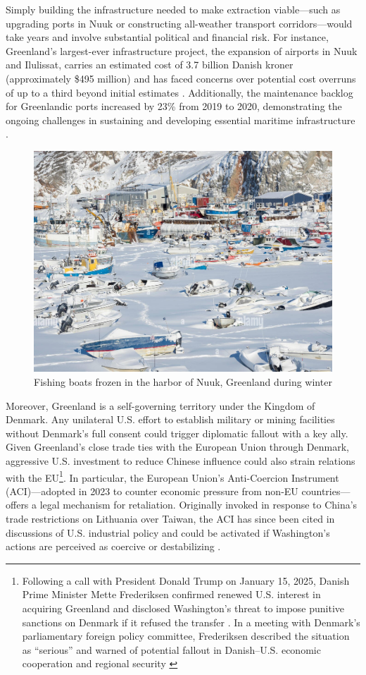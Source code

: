 \documentclass{adonis}
\begin{document}
    Simply building the infrastructure needed to make extraction viable—such as upgrading ports in Nuuk or constructing all-weather transport corridors—would take years and involve substantial political and financial risk. For instance, Greenland’s largest-ever infrastructure project, the expansion of airports in Nuuk and Ilulissat, carries an estimated cost of 3.7 billion Danish kroner (approximately \$495 million) and has faced concerns over potential cost overruns of up to a third beyond initial estimates \citep{asce2022airports, arctictoday2022overruns}. Additionally, the maintenance backlog for Greenlandic ports increased by 23\% from 2019 to 2020, demonstrating the ongoing challenges in sustaining and developing essential maritime infrastructure \citep{highnorth2021ports}.

     \begin{figure}[H]
        \centering
        \includegraphics[width=0.58\linewidth]{images/frozen-harbor-with-fishing-boats-greenland-WAK1F6.jpg}
        \caption{Fishing boats frozen in the harbor of Nuuk, Greenland during winter \citep{alamy_wak1f6}}
        \label{fig:enter-label}
    \end{figure}

    Moreover, Greenland is a self-governing territory under the Kingdom of Denmark. Any unilateral U.S. effort to establish military or mining facilities without Denmark’s full consent could trigger diplomatic fallout with a key ally. Given Greenland’s close trade ties with the European Union through Denmark, aggressive U.S. investment to reduce Chinese influence could also strain relations with the EU\footnote{Following a call with President Donald Trump on January 15, 2025, Danish Prime Minister Mette Frederiksen confirmed renewed U.S. interest in acquiring Greenland and disclosed Washington’s threat to impose punitive sanctions on Denmark if it refused the transfer \citep{earle2025greenland}. In a meeting with Denmark’s parliamentary foreign policy committee, Frederiksen described the situation as “serious” and warned of potential fallout in Danish–U.S. economic cooperation and regional security \citep{reuters2025greenland}}. In particular, the European Union’s Anti-Coercion Instrument (ACI)—adopted in 2023 to counter economic pressure from non-EU countries—offers a legal mechanism for retaliation. Originally invoked in response to China’s trade restrictions on Lithuania over Taiwan, the ACI has since been cited in discussions of U.S. industrial policy and could be activated if Washington’s actions are perceived as coercive or destabilizing \citep{wu2023aci, europarl2023aci}. 
\end{document}
